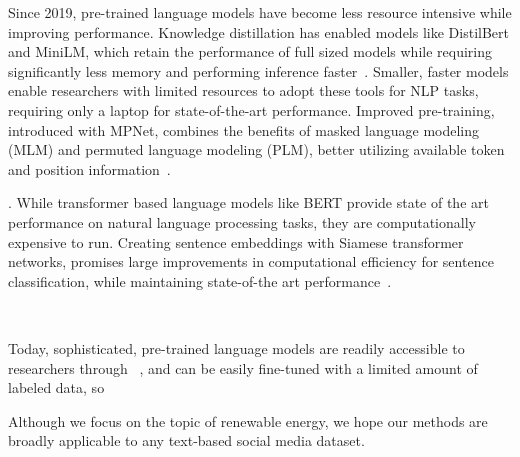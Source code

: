 Since 2019, pre-trained language models have become less resource intensive while improving performance.
Knowledge distillation has enabled models like DistilBert and MiniLM, 
which retain the performance of full sized models while requiring significantly less memory
and performing inference faster~\cite{sanh2019distilbert,wang2020minilm}. 
Smaller, faster models enable researchers with limited resources to adopt these tools for NLP tasks, requiring only a laptop for state-of-the-art performance.
Improved pre-training, introduced with MPNet,
combines the benefits of masked language modeling (MLM)
and permuted language modeling (PLM),
better utilizing available token and position information~\cite{song2020mpnet}.  



. 
While transformer based language models like BERT provide state of the art performance on natural language processing tasks, they are computationally expensive to run. Creating sentence embeddings with Siamese transformer networks, promises large improvements in computational efficiency for sentence classification, while maintaining state-of-the art performance~\cite{reimers-2019-sentence-bert}.

\cite{gao2021limitations}\cite{chang2020taming}




~\cite{antypas2022twitter} ~\cite{quercia2012tweetlda}


Today, sophisticated, pre-trained language models are readily accessible to researchers through ~\cite{wolf2020transformers}, and can be easily fine-tuned with a limited amount of labeled data, so ~\cite{yan2018few,wang2020generalizing}

\cite{kim2020exploring, jain2019sentiment}
\cite{}


Although we focus on the topic of renewable energy, we hope our methods are broadly applicable
to any text-based social media dataset.

